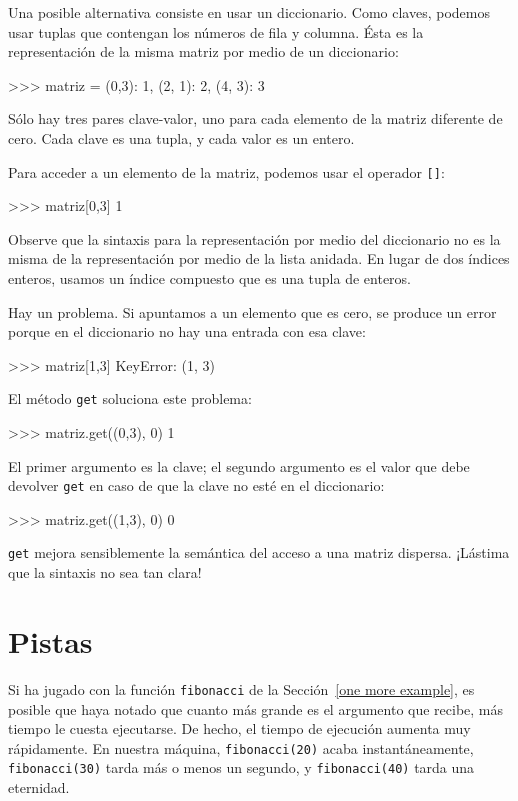 Una posible alternativa consiste en usar un diccionario. Como claves,
podemos usar tuplas que contengan los números de fila y columna. Ésta
es la representación de la misma matriz por medio de un diccionario:
\begin{pyconcode}
>>> matriz = {(0,3): 1, (2, 1): 2, (4, 3): 3}
\end{pyconcode}

Sólo hay tres pares clave-valor, uno para cada elemento de la matriz
diferente de cero. Cada clave es una tupla, y cada valor es un entero.

Para acceder a un elemento de la matriz, podemos usar el operador
\texttt{{[}{]}}:
\begin{pyconcode}
>>> matriz[0,3]
1
\end{pyconcode}

Observe que la sintaxis para la representación por medio del diccionario
no es la misma de la representación por medio de la lista anidada.
En lugar de dos índices enteros, usamos un índice compuesto que es
una tupla de enteros.

Hay un problema. Si apuntamos a un elemento que es cero, se produce
un error porque en el diccionario no hay una entrada con esa clave:

\begin{pyconcode}
>>> matriz[1,3]
KeyError: (1, 3)
\end{pyconcode}

El método \texttt{get} soluciona este problema:
\begin{pyconcode}
>>> matriz.get((0,3), 0)
1
\end{pyconcode}

El primer argumento es la clave; el segundo argumento es el valor
que debe devolver \texttt{get} en caso de que la clave no esté en
el diccionario:
\begin{pyconcode}
>>> matriz.get((1,3), 0)
0
\end{pyconcode}

\texttt{get} mejora sensiblemente la semántica del acceso a una matriz
dispersa. ¡Lástima que la sintaxis no sea tan clara!

\section{Pistas}

 

Si ha jugado con la función \texttt{fibonacci} de la Sección~\ref{one more example},
es posible que haya notado que cuanto más grande es el argumento que
recibe, más tiempo le cuesta ejecutarse. De hecho, el tiempo de ejecución
aumenta muy rápidamente. En nuestra máquina, \texttt{fibonacci(20)}
acaba instantáneamente, \texttt{fibonacci(30)} tarda más o menos un
segundo, y \texttt{fibonacci(40)} tarda una eternidad.

